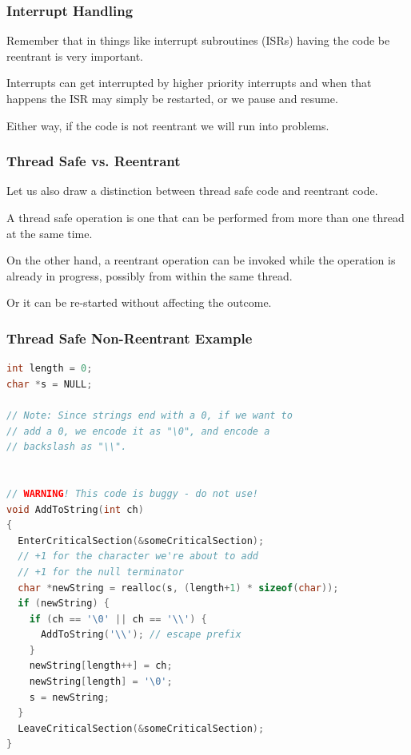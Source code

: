 \begin{frame}
\frametitle{Interrupt Handling}


Remember that in things like interrupt subroutines (ISRs) having the code be reentrant is very important. 

Interrupts can get interrupted by higher priority interrupts and when that happens the ISR may simply be restarted, or we pause and resume.

Either way, if the code is not reentrant we will run into problems.


\end{frame}

\begin{frame}
\frametitle{Thread Safe vs. Reentrant}

Let us also draw a distinction between thread safe code and reentrant code. 

A thread safe operation is one that can be performed from more than one thread at the same time. 

On the other hand, a reentrant operation can be invoked while the operation is already in progress, possibly from within the same thread. 

Or it can be re-started without affecting the outcome. 

\end{frame}



\begin{frame}[fragile]
\frametitle{Thread Safe Non-Reentrant Example}
{\scriptsize
\begin{lstlisting}[language=C]
int length = 0;
char *s = NULL;

// Note: Since strings end with a 0, if we want to
// add a 0, we encode it as "\0", and encode a
// backslash as "\\".


// WARNING! This code is buggy - do not use!
void AddToString(int ch)
{
  EnterCriticalSection(&someCriticalSection);
  // +1 for the character we're about to add
  // +1 for the null terminator
  char *newString = realloc(s, (length+1) * sizeof(char));
  if (newString) {
    if (ch == '\0' || ch == '\\') {
      AddToString('\\'); // escape prefix
    }
    newString[length++] = ch;
    newString[length] = '\0';
    s = newString;
  }
  LeaveCriticalSection(&someCriticalSection);
}
\end{lstlisting}
}


\end{frame}




